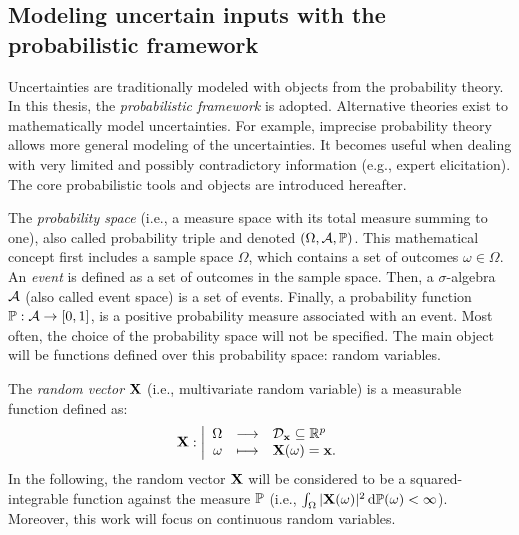 \subsection{Modeling uncertain inputs with the probabilistic framework}

Uncertainties are traditionally modeled with objects from the probability theory.
In this thesis, the \textit{probabilistic framework} is adopted. 
Alternative theories exist to mathematically model uncertainties. 
For example, imprecise probability theory allows more general modeling of the uncertainties. 
It becomes useful when dealing with very limited and possibly contradictory information (e.g., expert elicitation). 
The core probabilistic tools and objects are introduced hereafter. 

The \textit{probability space} (i.e., a measure space with its total measure summing to one), also called probability triple and denoted $(\Omega, \iA, \P)$.
This mathematical concept first includes a sample space $\Omega$, which contains a set of outcomes $\omega \in \Omega$. 
An \textit{event} is defined as a set of outcomes in the sample space.
Then, a $\sigma$-algebra $\iA$ (also called event space) is a set of events. 
Finally, a probability function $\P: \iA \rightarrow [0, 1]$, is a positive probability measure associated with an event.
Most often, the choice of the probability space will not be specified. 
The main object will be functions defined over this probability space: random variables. 

The \textit{random vector} $\bX$ (i.e., multivariate random variable) is a measurable function defined as: 
\begin{equation}
\bX : \bigg|
\begin{array}{rcl}
    \Omega & \longrightarrow & \iD_{\bx} \subseteq \R^p\\
    \omega & \longmapsto & \bX(\omega) = \bx.
\end{array}
\end{equation}
In the following, the random vector $\bX$ will be considered to be a squared-integrable function against the measure $\P$ (i.e., $\int_{\Omega} |\bX(\omega)|^2 \,\d \P(\omega) < \infty$).
Moreover, this work will focus on continuous random variables.

